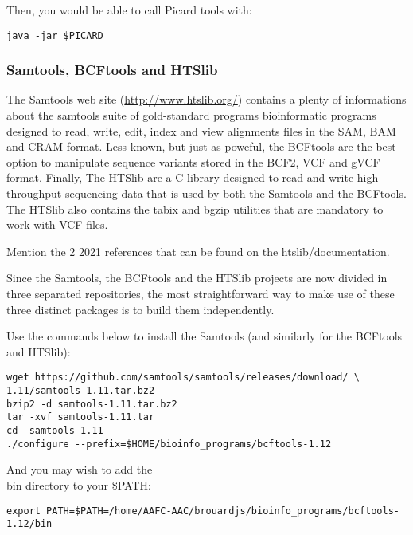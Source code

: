 Then, you would be able to call Picard tools with:

\begin{verbatim}
java -jar $PICARD
\end{verbatim}


\subsubsection{Samtools, BCFtools and HTSlib}


The Samtools web site (\href{http://www.htslib.org/}{http://www.htslib.org/}) contains a plenty of informations about the samtools suite of gold-standard programs bioinformatic programs designed to read, write, edit, index and view alignments files in the SAM, BAM and CRAM format. Less known, but just as poweful, the BCFtools are the best option to manipulate sequence variants stored in the BCF2, VCF and gVCF format. Finally, The HTSlib are a C library designed to read and write high-throughput sequencing data that is used by both the Samtools and the BCFtools. The HTSlib also contains the tabix and bgzip utilities that are mandatory to work with VCF files.

Mention the 2 2021 references that can be found on the htslib/documentation.

Since the Samtools, the BCFtools and the HTSlib projects are now divided in three separated repositories, the most straightforward way to make use of these three distinct packages is to build them independently. 

Use the commands below to install the Samtools (and similarly for the BCFtools and HTSlib):

\begin{verbatim}
wget https://github.com/samtools/samtools/releases/download/ \
1.11/samtools-1.11.tar.bz2
bzip2 -d samtools-1.11.tar.bz2	
tar -xvf samtools-1.11.tar
cd  samtools-1.11
./configure --prefix=$HOME/bioinfo_programs/bcftools-1.12
\end{verbatim}

And you may wish to add the \\bin directory to your \$PATH:

\begin{verbatim}
export PATH=$PATH=/home/AAFC-AAC/brouardjs/bioinfo_programs/bcftools-1.12/bin
\end{verbatim}









